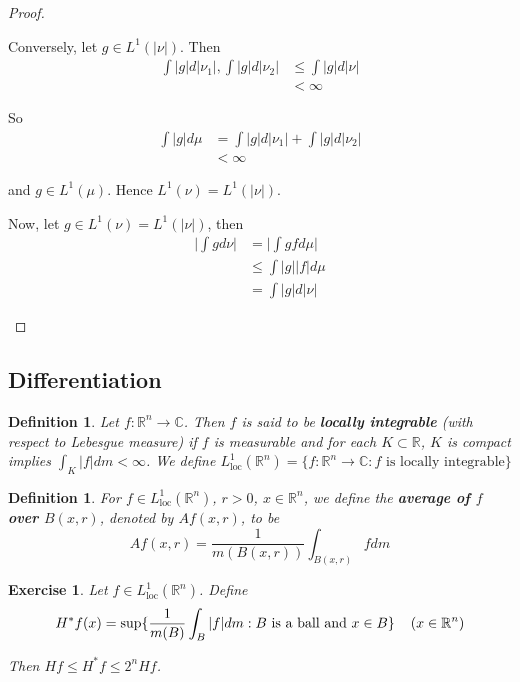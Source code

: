 \documentclass[12pt]{amsart}
\newtheorem{defn}[thm]{Definition}
\newtheorem{ex}[thm]{Exercise}
\newcommand{\C}{\mathbb{C}}
\newcommand{\R}{\mathbb{R}}
\newcommand{\Ll}{L^1_{\text{loc}}(\R^n)}
\begin{document}
\begin{proof}
\begin{enumerate}
			Conversely, let $g \in L^1(|\nu|)$. Then 
			\begin{align*}
				\int |g| d|\nu_1|, \int |g| d |\nu_2| 
				& \leq \int |g|d |\nu|\\
				& < \infty
			\end{align*}
			
			So 
			\begin{align*}
				\int |g| d\mu
				& =\int |g| d|\nu_1| + \int |g| d |\nu_2| \\
				& < \infty
			\end{align*}
			
			and $g \in L^1(\mu)$. Hence $L^1(\nu) = L^1(|\nu|)$. 
			
			Now, let $g \in L^1(\nu) = L^1(|\nu|)$, then 
			\begin{align*}
				\bigg| \int g d\nu \bigg| 
				&= \bigg| \int g f d\mu \bigg| \\
				& \leq \int |g||f|d\mu\\
				& = \int |g| d |\nu|
			\end{align*}
			
		\end{enumerate}
	\end{proof}
	
	\subsection{Differentiation}
	
	\begin{defn}
		Let $f: \R^n \rightarrow \C$. Then $f$ is said to be \textbf{locally integrable} (with respect to Lebesgue measure) if $f$ is measurable and for each $K \subset \R$, $K$ is compact implies $\int_K |f| dm < \infty$. We define $L^1_{\text{loc}}(\R^n) = \{f:\R^n \rightarrow \C: f \text{ is locally integrable}\}$
	\end{defn}
	
	\begin{defn}
		For $f \in \Ll$, $r>0$, $x \in \R^n$, we define the \textbf{average of $f$ over $B(x,r)$}, denoted by $Af(x,r)$, to be $$Af(x,r) = \frac{1}{m(B(x,r))}\int_{B(x,r)}fdm$$
	\end{defn}
	
	\begin{ex}
		Let $f \in \Ll$. Define $$H^*f(x) = \sup\{\frac{1}{m(B)}\int_{B}|f|dm: B \text{ is a ball and } x \in B\} \hspace{4mm} (x \in \R^n)$$
		
		Then $Hf \leq H^*f \leq 2^n Hf$. 
	\end{ex}
	
\end{document}
